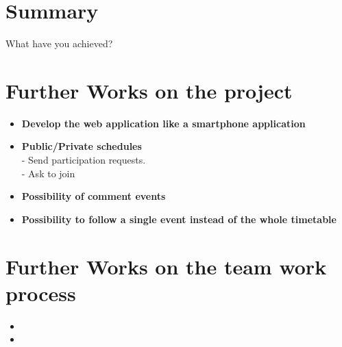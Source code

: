 
\section{Summary}
What have you achieved?

\section{Further Works on the project}
\vspace{-5mm}
\begin{itemize}
 \setlength{\itemsep}{-5pt}
\item \textbf{Develop the web application like a smartphone application}

\item \textbf{Public/Private schedules}\\
- Send participation requests.\\
- Ask to join

\item \textbf{Possibility of comment events}

\item \textbf{Possibility to follow a single event instead of the whole timetable}
\end{itemize}

\section{Further Works on the team work process}
\vspace{-5mm}
\begin{itemize}
 \setlength{\itemsep}{-5pt}
 \item
 \item
\end{itemize}
